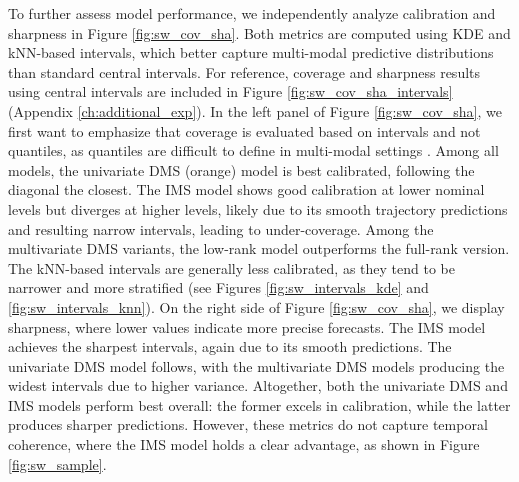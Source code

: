 \documentclass[a4paper,oneside,bibliography=totoc]{scrbook}
\begin{document}
To further assess model performance, we independently analyze calibration and sharpness in Figure \ref{fig:sw_cov_sha}. Both metrics are computed using KDE and kNN-based intervals, which better capture multi-modal predictive distributions than standard central intervals. For reference, coverage and sharpness results using central intervals are included in Figure \ref{fig:sw_cov_sha_intervals} (Appendix \ref{ch:additional_exp}).
In the left panel of Figure \ref{fig:sw_cov_sha}, we first want to emphasize that coverage is evaluated based on intervals and not quantiles, as quantiles are difficult to define in multi-modal settings \cite{deliu_alternative_2024}. Among all models, the univariate DMS (orange) model is best calibrated, following the diagonal the closest. The IMS model shows good calibration at lower nominal levels but diverges at higher levels, likely due to its smooth trajectory predictions and resulting narrow intervals, leading to under-coverage.
Among the multivariate DMS variants, the low-rank model outperforms the full-rank version. The kNN-based intervals are generally less calibrated, as they tend to be narrower and more stratified (see Figures \ref{fig:sw_intervals_kde} and \ref{fig:sw_intervals_knn}).
On the right side of Figure \ref{fig:sw_cov_sha}, we display sharpness, where lower values indicate more precise forecasts. The IMS model achieves the sharpest intervals, again due to its smooth predictions. The univariate DMS model follows, with the multivariate DMS models producing the widest intervals due to higher variance.
Altogether, both the univariate DMS and IMS models perform best overall: the former excels in calibration, while the latter produces sharper predictions. However, these metrics do not capture temporal coherence, where the IMS model holds a clear advantage, as shown in Figure \ref{fig:sw_sample}.\\
\end{document}
